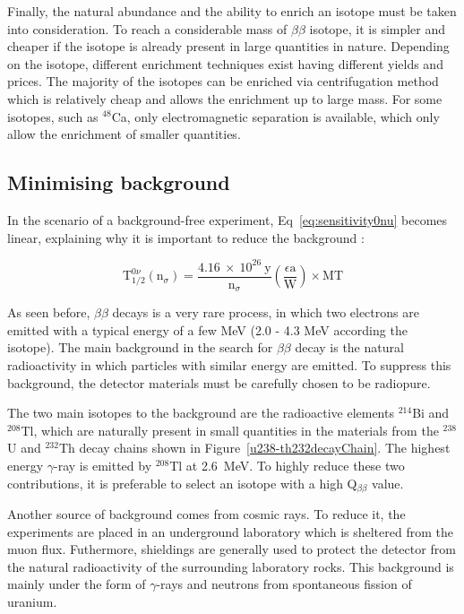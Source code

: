 \documentclass[main.tex]{subfiles}
\begin{document}
\bigskip


\NI Finally, the natural abundance and the ability to enrich an isotope must be taken into consideration. To reach a considerable mass of $\beta\beta$ isotope, it is simpler and cheaper if the isotope is already present in large quantities in nature. Depending on the isotope, different enrichment techniques exist having different yields and prices. The majority of the isotopes can be enriched via centrifugation method which is relatively cheap and allows the enrichment up to large mass. For some isotopes, such as $^{48}$Ca, only electromagnetic separation is available, which only allow the enrichment of smaller quantities.


\subsection{Minimising background}\label{sec:MinimisingBkg}


\NI In the scenario of a background-free experiment, Eq~\ref{eq:sensitivity0nu} becomes linear, explaining why it is important to reduce the background :


\begin{equation}
\text{T}_{\text{1/2}}^{0\nu} (\text{n}_\sigma) = \frac{\text{4.16}~\times~\text{10}^{\text{26}}~\text{y}}{\text{n}_\sigma} \left(\frac{\epsilon \text{a}}{\text{W}} \right) \times \text{MT}
\end{equation}


\NI As seen before, $\beta\beta$ decays is a very rare process, in which two electrons are emitted with a typical energy of a few MeV (2.0 - 4.3 MeV according the isotope). The main background in the search for $\beta\beta$ decay is the natural radioactivity in which particles with similar energy are emitted. To suppress this background, the detector materials must be carefully chosen to be radiopure.


\bigskip


\NI The two main isotopes to the background are the radioactive elements $^{\text{214}}$Bi and $^{\text{208}}$Tl, which are naturally present in small quantities in the materials from the $^{\text{238}}$U and $^{\text{232}}$Th decay chains shown in Figure~\ref{u238-th232decayChain}. The highest energy $\gamma$-ray is emitted by $^{\text{208}}$Tl at 2.6~MeV. To highly reduce these two contributions, it is preferable to select an isotope with a high Q$_{\beta\beta}$ value.


\bigskip

\NI Another source of background comes from cosmic rays. To reduce it, the experiments are placed in an underground laboratory which is sheltered from the muon flux. Futhermore, shieldings are generally used to protect the detector from the natural radioactivity of the surrounding laboratory rocks. This background is mainly under the form of $\gamma$-rays and neutrons from spontaneous fission of uranium.
\end{document}
